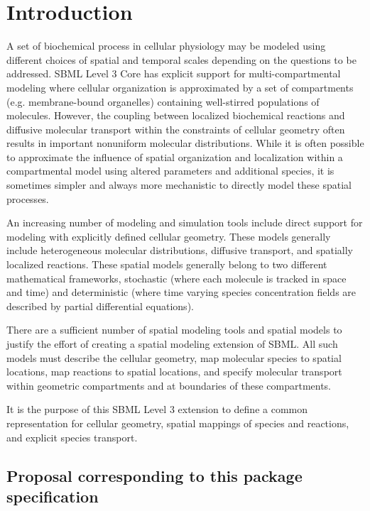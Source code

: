 
\section{Introduction}
\label{intro}

A set of biochemical process in cellular physiology may be modeled using different choices of spatial and temporal scales depending on the questions to be addressed.  SBML Level 3 Core has explicit support for multi-compartmental modeling where cellular organization is approximated by a set of compartments (e.g. membrane-bound organelles) containing well-stirred populations of molecules.  However, the coupling between localized biochemical reactions and diffusive molecular transport within the constraints of cellular geometry often results in important nonuniform molecular distributions.  While it is often possible to approximate the influence of spatial organization and localization within a compartmental model using altered parameters and additional species, it is sometimes simpler and always more mechanistic to directly model these spatial processes.  

An increasing number of modeling and simulation tools include direct support for modeling with explicitly defined cellular geometry.  These models generally include heterogeneous molecular distributions, diffusive transport, and spatially localized reactions.  These spatial models generally belong to two different mathematical frameworks, stochastic (where each molecule is tracked in space and time) and deterministic (where time varying species concentration fields are described by partial differential equations).  

There are a sufficient number of spatial modeling tools and spatial models to justify the effort of creating a spatial modeling extension of SBML.  All such models must describe the cellular geometry, map molecular species to spatial locations, map reactions to spatial locations, and specify molecular transport within geometric compartments and at boundaries of these compartments.  

It is the purpose of this SBML Level 3 extension to define a common representation for cellular geometry, spatial mappings of species and reactions, and explicit species transport.  


\subsection{Proposal corresponding to this package specification}

